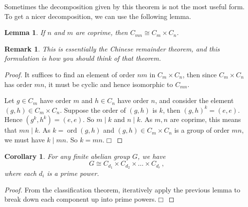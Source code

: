 \documentclass{article}
\theoremstyle{plain}\theoremheaderfont{\normalfont\itshape}\theorembodyfont{\rmfamily}\theoremseparator{.}\newtheorem*{rem}{Remark}\newtheorem*{ex}{Example}\newtheorem*{proof}{Proof}\newtheorem*{altp}{Alternative proof}\newtheorem*{nonex}{Non-Example}
\theoremstyle{plain}\theoremheaderfont{\normalfont\bfseries}\theorembodyfont{\rmfamily}\theoremseparator{.}\newtheorem{thm}{Theorem}[section]\newtheorem{lem}[thm]{Lemma}\newtheorem{prop}[thm]{Proposition}\newtheorem*{cor}{Corollary}\newtheorem{defn}[thm]{Definition}\newtheorem{clm}[thm]{Claim}\newtheorem{clminproof}{Claim}\newtheorem*{notn}{Notation}\newtheorem*{exer}{Exercise}\newtheorem*{lemnn}{Lemma}
\theoremstyle{break}\theoremheaderfont{\normalfont\itshape}\theorembodyfont{\rmfamily}\theoremseparator{.\medskip}\newtheorem*{proofskip}{Proof}\newtheorem*{exs}{Examples}\newtheorem*{rems}{Remarks}\newtheorem*{obs}{Observations}
\theoremstyle{break}\theoremheaderfont{\normalfont\bfseries}\theorembodyfont{\rmfamily}\theoremseparator{.\medskip}\newtheorem{lemskip}[thm]{Lemma}\newtheorem{defnskip}[thm]{Definition}\newtheorem{propskip}[thm]{Proposition}\newtheorem{thmskip}[thm]{Theorem}
\numberwithin{equation}{section}
\newcommand{\qed}{\hfill\ensuremath{\Box}}
\DeclareMathOperator*{\ord}{ord}
\begin{document}
    Sometimes the decomposition given by this theorem is not the most useful form. To get a nicer decomposition, we can use the following lemma.
    \begin{lem}
        If \(n\) and \(m\) are coprime, then \(C_{mn}\cong C_m\times C_n\).
    \end{lem}
    \begin{rem}
        This is essentially the Chinese remainder theorem, and this formulation is how you should think of that theorem.
    \end{rem}
    \begin{proof}
        It suffices to find an element of order \(nm\) in \(C_m\times C_n\), then since \(C_m\times C_n\) has order \(mn\), it must be cyclic and hence isomorphic to \(C_{mn}\).

        Let \(g\in C_m\) have order \(m\) and \(h\in C_n\) have order \(n\), and consider the element \((g,h)\in C_m\times C_n\). Suppose the order of \((g,h)\) is \(k\), then \((g,h)^{k}=(e,e)\). Hence \((g^k,h^k)=(e,e)\). So \(m\mid k\) and \(n\mid k\). As \(m,n\) are coprime, this means that \(mn\mid k\). As \(k=\ord(g,h)\) and \((g,h)\in C_m\times C_n\) is a group of order \(mn\), we must have \(k\mid mn\). So \(k=mn\).\qed
    \end{proof}
    \begin{cor}
        For any finite abelian group \(G\), we have
        \[G\cong C_{d_1}\times C_{d_2}\times\dots\times C_{d_r}\,,\]
        where each \(d_i\) is a prime power.
    \end{cor}
    \begin{proof}
        From the classification theorem, iteratively apply the previous lemma to break down each component up into prime powers.\qed
    \end{proof}
\end{document}
